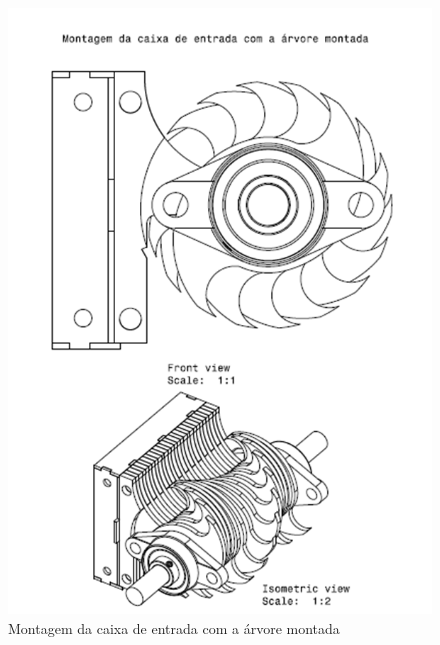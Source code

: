 \begin{anexosenv}
\begin{figure}[!ht]
	\centering
		\includegraphics[scale=0.6]{figuras/estrutura/anexos/11.png}
	\caption{Montagem da caixa de entrada com a árvore montada}
\end{figure}


\end{anexosenv}
